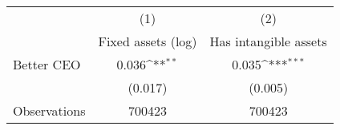 {
\def\sym#1{\ifmmode^{#1}\else\(^{#1}\)\fi}
\begin{tabular}{l*{2}{c}}
\hline\hline
                    &\multicolumn{1}{c}{(1)}&\multicolumn{1}{c}{(2)}\\
                    &\multicolumn{1}{c}{Fixed assets (log)}&\multicolumn{1}{c}{Has intangible assets}\\
\hline
Better CEO          &       0.036\sym{**} &       0.035\sym{***}\\
                    &     (0.017)         &     (0.005)         \\
\hline
Observations        &      700423         &      700423         \\
\hline\hline
\end{tabular}
}
